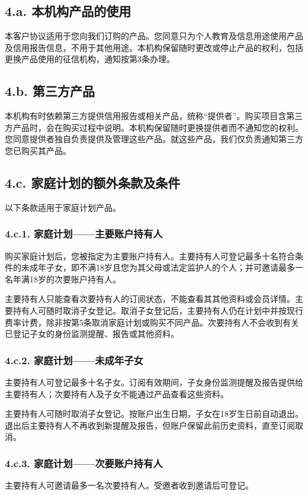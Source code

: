 \documentclass[UTF8,fontset=none,11pt,a4paper]{ctexart}
\begin{document}
\subsection*{4.a. 本机构产品的使用}
本客户协议适用于您向我们订购的产品。您同意只为个人教育及信息用途使用产品及信用报告信息，不用于其他用途。本机构保留随时更改或停止产品的权利，包括更换产品使用的征信机构，通知按第3条办理。


\subsection*{4.b. 第三方产品}
本机构有时依赖第三方提供信用报告或相关产品，统称“提供者”。购买项目含第三方产品时，会在购买过程中说明。本机构保留随时更换提供者而不通知您的权利。您同意提供者独自负责提供及管理这些产品。就这些产品，我们仅负责通知第三方您已购买其产品。


\subsection*{4.c. 家庭计划的额外条款及条件}
以下条款适用于家庭计划产品。


\subsubsection*{4.c.1. 家庭计划——主要账户持有人}
购买家庭计划后，您被指定为主要账户持有人。主要持有人可登记最多十名符合条件的未成年子女，即不满18岁且您为其父母或法定监护人的个人；并可邀请最多一名年满18岁的次要账户持有人。


主要持有人只能查看次要持有人的订阅状态，不能查看其其他资料或会员详情。主要持有人可随时取消子女登记。取消子女登记后，主要持有人仍在计划中并按现行费率计费，除非按第5条取消家庭计划或购买不同产品。次要持有人不会收到有关已登记子女的身份监测提醒、报告或其他资料。


\subsubsection*{4.c.2. 家庭计划——未成年子女}
主要持有人可登记最多十名子女。订阅有效期间，子女身份监测提醒及报告提供给主要持有人；次要持有人及子女不能通过产品查看这些资料。


主要持有人可随时取消子女登记。按账户出生日期，子女在18岁生日前自动退出。退出后主要持有人不再收到新提醒及报告，但账户保留此前历史资料，直至订阅取消。


\subsubsection*{4.c.3. 家庭计划——次要账户持有人}
主要持有人可邀请最多一名次要持有人。受邀者收到邀请后可登记。
\end{document}
